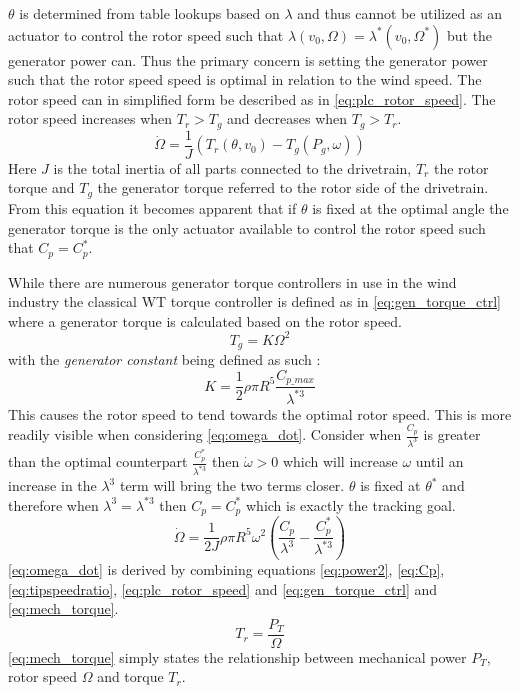 $ \theta $ is determined from table lookups based on $ \lambda $ and thus cannot be utilized as an actuator to control the rotor speed such that $ \lambda(v_0, \Omega) = \lambda^*(v_0, \Omega^*) $ but the generator power can. Thus the primary concern is setting the generator power such that the rotor speed speed is optimal in relation to the wind speed. The rotor speed can in simplified form be described as in \cref{eq:plc_rotor_speed}. The rotor speed increases when $ T_r > T_g $ and decreases when $ T_g > T_r $.
\begin{equation}\label{eq:plc_rotor_speed}
	\dot{\Omega} = \dfrac{1}{J} \left( T_r(\theta, v_0) - T_g(P_g, \omega) \right)
\end{equation}
Here $ J $ is the total inertia of all parts connected to the drivetrain, $ T_r $ the rotor torque and $ T_g $ the generator torque referred to the rotor side of the drivetrain. From this equation it becomes apparent that if $ \theta $ is fixed at the optimal angle the generator torque is the only actuator available to control the rotor speed such that $ C_p = C_p^* $.

While there are numerous generator torque controllers in use in the wind industry the classical WT torque controller is defined as in \cref{eq:gen_torque_ctrl} where a generator torque is calculated based on the rotor speed.
\begin{equation}\label{eq:gen_torque_ctrl}
	T_g = K \Omega^2
\end{equation}
with the \textit{generator constant} being defined as such \cite{Pao2009}:
\begin{equation}\label{eq:gen_torque_const}
	K = \dfrac{1}{2} \rho \pi R^5 \dfrac{C_{p\_max}}{\lambda^{*3}}
\end{equation}
This causes the rotor speed to tend towards the optimal rotor speed. This is more readily visible when considering \cref{eq:omega_dot}. Consider when $ \frac{C_p}{\lambda^3} $ is greater than the optimal counterpart $ \frac{C_p^*}{\lambda^{*3}} $ then $ \dot{\omega} > 0 $ which will increase $ \omega $ until an increase in the $ \lambda^3 $ term will bring the two terms closer. $ \theta $ is fixed at $ \theta^* $ and therefore when $ \lambda^3 = \lambda^{*3} $ then $ C_p = C_p^* $ which is exactly the tracking goal.
\begin{equation}\label{eq:omega_dot}
	\dot{\Omega} = \dfrac{1}{2 J} \rho \pi R^5 \omega^2 \left( \dfrac{C_p}{\lambda^3} - \dfrac{C_p^*}{\lambda^{*3}} \right)
\end{equation}
\cref{eq:omega_dot} is derived by combining equations \cref{eq:power2}, \cref{eq:Cp}, \cref{eq:tipspeedratio}, \cref{eq:plc_rotor_speed} and \cref{eq:gen_torque_ctrl} and \cref{eq:mech_torque}.
\begin{equation}\label{eq:mech_torque}
	T_r = \dfrac{P_T}{\Omega}
\end{equation}
\cref{eq:mech_torque} simply states the relationship between mechanical power $ P_T $, rotor speed $ \Omega $ and torque $ T_r $.

